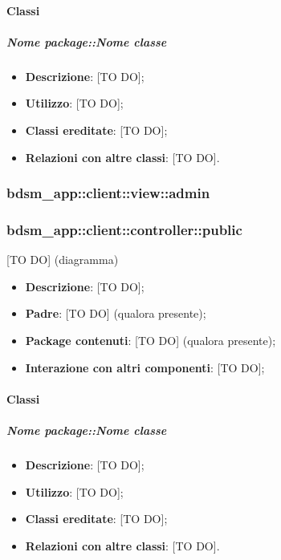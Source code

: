 		\paragraph{Classi} %
			\subparagraph{Nome package::Nome classe} %
			\label{subp:subparagraph_name}
				\begin{itemize}
					\item \textbf{Descrizione}: [TO DO];
					\item \textbf{Utilizzo}: [TO DO];
					\item \textbf{Classi ereditate}: [TO DO];
					\item \textbf{Relazioni con altre classi}: [TO DO].
				\end{itemize}

	\subsubsection{bdsm\_app::client::view::admin} %
	\label{ssub:bdsm_app_client_view_admin}
	



	\subsubsection{bdsm\_app::client::controller::public} %
	\label{ssub:bdsm_app_client_controller_public}
	[TO DO] (diagramma) \newline \newline

	\begin{itemize}
		\item \textbf{Descrizione}: [TO DO];
		\item \textbf{Padre}: [TO DO] (qualora presente);
		\item \textbf{Package contenuti}: [TO DO] (qualora presente);
		\item \textbf{Interazione con altri componenti}: [TO DO];
	\end{itemize}

		\paragraph{Classi} %
			\subparagraph{Nome package::Nome classe} %
			\label{subp:subparagraph_name}
				\begin{itemize}
					\item \textbf{Descrizione}: [TO DO];
					\item \textbf{Utilizzo}: [TO DO];
					\item \textbf{Classi ereditate}: [TO DO];
					\item \textbf{Relazioni con altre classi}: [TO DO].
				\end{itemize}



